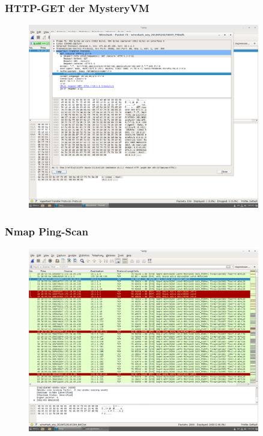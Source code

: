 \documentclass[12pt]{article}
\theoremstyle{plain}
\begin{document}
\subsubsection*{HTTP-GET der MysteryVM}
\begin{figure}[!ht]
	\centering
     \includegraphics[width=0.9\textwidth]{Bilder/http_get_von_mysteryVM.png}
\end{figure}
\newpage
\subsubsection*{Nmap Ping-Scan}
\begin{figure}[!ht]
	\centering
     \includegraphics[width=0.9\textwidth]{Bilder/nmap_ping_scan.png}
\end{figure}
\newpage
\end{document}
